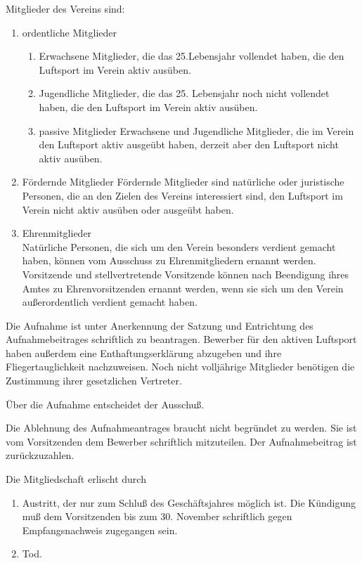 \documentclass[11pt,a4paper,parskip=half]{scrartcl}
\begin{document}
\begin{contract}
\begin{multicols}{2}
		Mitglieder des Vereins sind:
		\begin{enumerate}
			\item ordentliche Mitglieder
		\begin{enumerate}
			\item Erwachsene Mitglieder,
      die das 25.Lebensjahr vollendet haben,
      die den Luftsport im Verein aktiv
			ausüben.
			\item Jugendliche Mitglieder,
      die das 25. Lebensjahr noch nicht vollendet haben,
      die den Luftsport im Verein aktiv ausüben.
			\item{passive Mitglieder} Erwachsene und Jugendliche Mitglieder,
      die im Verein den Luftsport aktiv ausgeübt haben,
      derzeit aber den Luftsport nicht aktiv ausüben.
		\end{enumerate}
	\item{Fördernde Mitglieder} Fördernde Mitglieder sind natürliche oder juristische Personen,
    die an den Zielen des Vereins interessiert sind,
    den Luftsport im Verein nicht aktiv ausüben oder ausgeübt haben.

	
		\item{Ehrenmitglieder}\\
		Natürliche Personen,
    die sich um den Verein besonders verdient gemacht haben,
    können vom Ausschuss zu Ehrenmitgliedern ernannt werden.
		Vorsitzende und stellvertretende Vorsitzende können nach Beendigung ihres Amtes zu Ehrenvorsitzenden ernannt werden,
    wenn sie sich um den Verein außerordentlich verdient gemacht haben.
	\end{enumerate}

		Die Aufnahme ist unter Anerkennung der Satzung und Entrichtung des Aufnahmebeitrages schriftlich zu beantragen.
		Bewerber für den aktiven Luftsport haben außerdem eine Enthaftungserklärung abzugeben und ihre Fliegertauglichkeit nachzuweisen.
		Noch nicht volljährige Mitglieder benötigen die Zustimmung ihrer gesetzlichen Vertreter.

		Über die Aufnahme entscheidet der Ausschuß.

		Die Ablehnung des Aufnahmeantrages braucht nicht begründet zu werden.
		Sie ist vom Vorsitzenden dem Bewerber schriftlich mitzuteilen.
		Der Aufnahmebeitrag ist zurückzuzahlen.

		Die Mitgliedschaft erlischt durch
		\begin{enumerate}[label=\alph*)]
		\item Austritt,
    der nur zum Schluß des Geschäftsjahres möglich ist.
		Die Kündigung muß dem Vorsitzenden bis zum 30. November schriftlich gegen Empfangsnachweis zugegangen sein.
		\item Tod.


\end{enumerate}
\end{multicols}
\end{contract}
\end{document}

